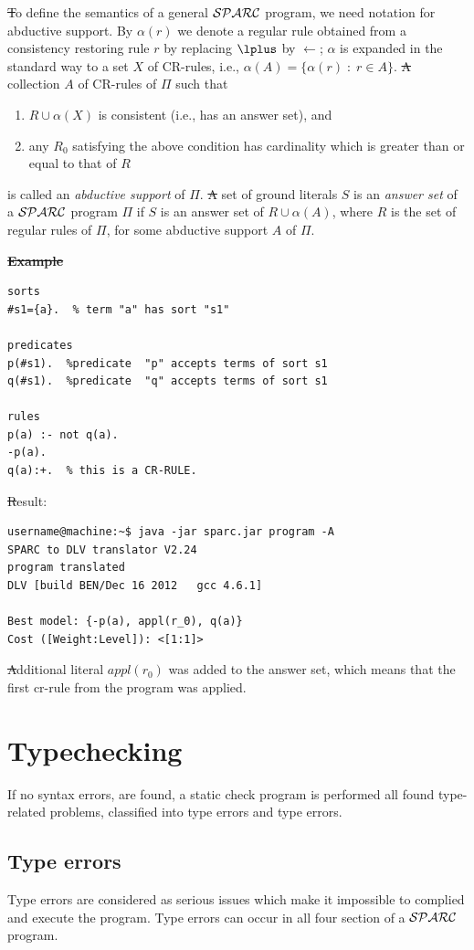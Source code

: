 \documentclass[12pt, letterpaper]{article}
\begin{document}
\st To define the semantics of a general ${\cal SPARC}$ program, we need notation for abductive support.
By $\alpha(r)$ we denote a regular rule
obtained from a consistency restoring rule $r$
by replacing $\lplus$ by $\leftarrow$;
$\alpha$ is expanded in the standard way to a set $X$ of CR-rules,
i.e., $\alpha(A) = \{\alpha(r)\; :\; r \in A\}$.
\st A %
collection $A$ of CR-rules of $\Pi$ such that
\begin{enumerate}
\item $R \cup \alpha(X)$ is consistent (i.e., has an answer set), and
\item any $R_0$ satisfying the above condition has cardinality
which is greater than or equal to that of $R$
\end{enumerate}
is called an {\em abductive support} of $\Pi$.
\st A set of ground literals $S$ is an {\em answer set} of a ${\cal SPARC}$ program 
$\Pi$ if $S$ is an answer set of $R \cup \alpha(A)$, where $R$ is the set of regular rules of $\Pi$, for some abductive
support $A$ of $\Pi$.

\st \textbf{Example}
\begin{verbatim}
sorts
#s1={a}.  % term "a" has sort "s1"

predicates
p(#s1).  %predicate  "p" accepts terms of sort s1 
q(#s1).  %predicate  "q" accepts terms of sort s1 

rules
p(a) :- not q(a).
-p(a).
q(a):+.  % this is a CR-RULE. 
\end{verbatim}
\st Result:
\begin{verbatim}
username@machine:~$ java -jar sparc.jar program -A
SPARC to DLV translator V2.24
program translated
DLV [build BEN/Dec 16 2012   gcc 4.6.1]

Best model: {-p(a), appl(r_0), q(a)}
Cost ([Weight:Level]): <[1:1]>
\end{verbatim}

\st Additional literal $appl(r_0)$ was added to the answer set, which means that the 
first cr-rule from the program was applied.

\section{Typechecking}
If no syntax errors, are found,  a static check program is performed all found type-related problems, classified into type errors and type errors.
\subsection{Type errors}
Type errors are considered as serious issues which make it  impossible to complied and execute the program.
Type errors can occur in all four section of a ${\cal SPARC}$ program.
\end{document}
